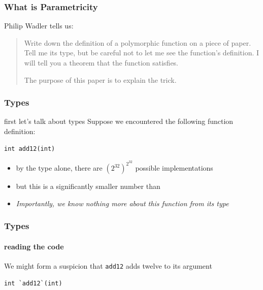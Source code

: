 \begin{frame}
\frametitle{What is Parametricity}
\begin{block}{Philip Wadler \cite{wadler1989theorems} tells us:}
\begin{quotation}
Write down the definition of a polymorphic function on a piece of paper. Tell me its type, but be careful not to let me see the function's definition. I will tell you a theorem that the function satisfies.

The purpose of this paper is to explain the trick.
\end{quotation}
\end{block}
\end{frame}

\begin{frame}[fragile]
\frametitle{Types}
\begin{block}{first let's talk about types}
Suppose we encountered the following function definition:
\begin{lstlisting}
int add12(int)
\end{lstlisting}
\end{block}
\begin{itemize}
  \item<1-> by the type alone, there are {$({2^{32}})^{2^{32}}$} possible implementations
  \item<2-> but this is a significantly smaller number than 
  \item<3-> \emph{Importantly, we know nothing more about this function from its type}
\end{itemize}
\end{frame}

\begin{frame}[fragile]
\frametitle{Types}
\framesubtitle{reading the code}
We might form a suspicion that \lstinline[style=scala]$add12$ adds twelve to its argument
\begin{lstlisting}[style=scala]
int `add12`(int)
\end{lstlisting}
\end{frame}

